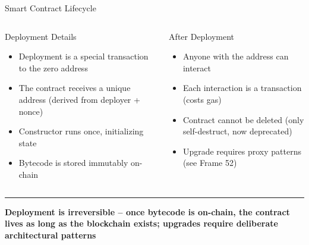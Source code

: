 \documentclass[8pt,aspectratio=169]{beamer}
\newcommand{\bottomnote}[1]{\vfill\vspace{-2mm}\textcolor{mllavender2}{\rule{\textwidth}{0.4pt}}\vspace{1mm}\footnotesize\textbf{#1}}
\begin{document}
\begin{frame}{Smart Contract Lifecycle}
\vspace{4mm}
\begin{columns}[T]
\begin{block}{Deployment Details}
\footnotesize
\begin{itemize}
  \item Deployment is a special transaction to the zero address
  \item The contract receives a unique address (derived from deployer + nonce)
  \item Constructor runs once, initializing state
  \item Bytecode is stored immutably on-chain
\end{itemize}
\end{block}
\begin{block}{After Deployment}
\footnotesize
\begin{itemize}
  \item Anyone with the address can interact
  \item Each interaction is a transaction (costs gas)
  \item Contract cannot be deleted (only self-destruct, now deprecated)
  \item Upgrade requires proxy patterns (see Frame 52)
\end{itemize}
\end{block}
\end{columns}
\bottomnote{Deployment is irreversible -- once bytecode is on-chain, the contract lives as long as the blockchain exists; upgrades require deliberate architectural patterns}
\end{frame}
\end{document}
